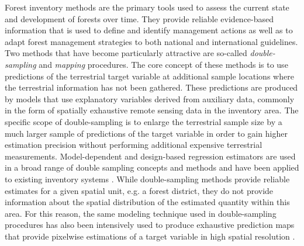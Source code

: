 Forest inventory methods are the primary tools used to assess the current state and development of forests over time. They provide reliable evidence-based information that is used to define and identify management actions as well as to adapt forest management strategies to both national and international guidelines. Two methods that have become particularly attractive are so-called \textit{double-sampling} \citep[]{mandallaz2008} and \textit{mapping}  procedures. The core concept of these methods is to use predictions of the terrestrial target variable at additional sample locations where the terrestrial information has not been gathered. These predictions are produced by models that use explanatory variables derived from auxiliary data, commonly in the form of spatially exhaustive remote sensing data in the inventory area.  The specific scope of double-sampling is to enlarge the terrestrial sample size by a much larger sample of predictions of the target variable in order to gain higher estimation precision without performing additional expensive terrestrial measurements. Model-dependent and design-based regression estimators are used in a broad range of double sampling concepts and methods \citep{gregoire2007, kohl2006, schreuder1993, saborowski2010, mandallaz2013a, mandallaz2013c} and have been applied to existing inventory systems \citep{breidenbach2012, vonLuebke2014, mandallaz2013b, magnussen2014, massey2014a}. While double-sampling methods provide reliable estimates for a given spatial unit, e.g. a forest district, they do not provide information about the spatial distribution of the estimated quantity within this area. For this reason, the same modeling technique used in double-sampling procedures has also been intensively used to produce exhaustive prediction maps that provide pixelwise estimations of a target variable in high spatial resolution \citep{bohlin2017, latifi2010, tonolli2011, hill2014, nink2015}.\par

